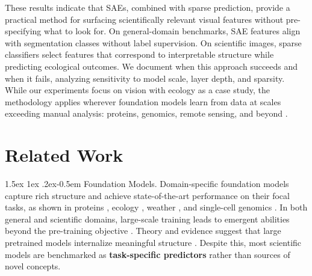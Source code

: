 \documentclass{article}
\makeatletter
\renewcommand{\paragraph}{%
  \@startsection{paragraph}{4}%
  {\z@}{1.5ex \@plus 1ex \@minus .2ex}{-0.5em}%
  {\normalfont\normalsize\bfseries}%
}
\theoremstyle{plain}
\theoremstyle{definition}
\theoremstyle{remark}
\makeatother
\begin{document}
These results indicate that SAEs, combined with sparse prediction, provide a practical method for surfacing scientifically relevant visual features without pre-specifying what to look for.
On general-domain benchmarks, SAE features align with segmentation classes without label supervision.
On scientific images, sparse classifiers select features that correspond to interpretable structure while predicting ecological outcomes.
We document when this approach succeeds and when it fails, analyzing sensitivity to model scale, layer depth, and sparsity.
While our experiments focus on vision with ecology as a case study, the methodology applies wherever foundation models learn from data at scales exceeding manual analysis: proteins, genomics, remote sensing, and beyond \citep{abramson2024alphafold3,lam2023graphcast,cui2024scgpt}.

\section{Related Work}


\paragraph{Foundation Models.}
Domain-specific foundation models capture rich structure and achieve state-of-the-art performance on their focal tasks, as shown in proteins \citep{abramson2024alphafold3,hayes2025esm3}, ecology \citep{stevens2024bioclip}, weather \citep{lam2023graphcast,price2025gencast}, and single-cell genomics \citep{cui2024scgpt}.
In both general and scientific domains, large-scale training leads to emergent abilities beyond the pre-training objective \citep{wei2022emergent,gu2025bioclip2}.
Theory and evidence suggest that large pretrained models internalize meaningful structure \citep{ha2018world,caron2021dinov1,lecun2022jepa,huh2024platonic}.
Despite this, most scientific models are benchmarked as \textbf{task-specific predictors} rather than sources of novel concepts.
\end{document}
